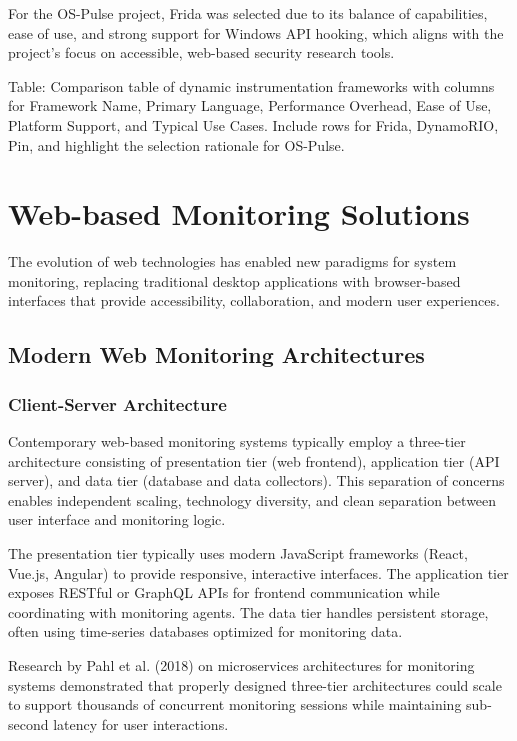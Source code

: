 For the OS-Pulse project, Frida was selected due to its balance of capabilities, ease of use, and strong support for Windows API hooking, which aligns with the project's focus on accessible, web-based security research tools.

{{Table: Comparison table of dynamic instrumentation frameworks with columns for Framework Name, Primary Language, Performance Overhead, Ease of Use, Platform Support, and Typical Use Cases. Include rows for Frida, DynamoRIO, Pin, and highlight the selection rationale for OS-Pulse.}}

\section{Web-based Monitoring Solutions}

The evolution of web technologies has enabled new paradigms for system monitoring, replacing traditional desktop applications with browser-based interfaces that provide accessibility, collaboration, and modern user experiences.

\subsection{Modern Web Monitoring Architectures}

\subsubsection{Client-Server Architecture}
Contemporary web-based monitoring systems typically employ a three-tier architecture consisting of presentation tier (web frontend), application tier (API server), and data tier (database and data collectors). This separation of concerns enables independent scaling, technology diversity, and clean separation between user interface and monitoring logic.

The presentation tier typically uses modern JavaScript frameworks (React, Vue.js, Angular) to provide responsive, interactive interfaces. The application tier exposes RESTful or GraphQL APIs for frontend communication while coordinating with monitoring agents. The data tier handles persistent storage, often using time-series databases optimized for monitoring data.

Research by Pahl et al. (2018) on microservices architectures for monitoring systems demonstrated that properly designed three-tier architectures could scale to support thousands of concurrent monitoring sessions while maintaining sub-second latency for user interactions.

